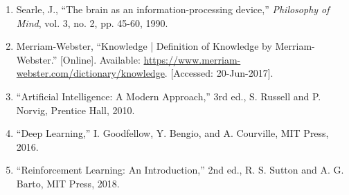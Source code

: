 \documentclass[a4paper, 11pt]{article}
\begin{document}
\begin{enumerate}
    \item Searle, J., “The brain as an information-processing device,” \textit{Philosophy of Mind}, vol. 3, no. 2, pp. 45-60, 1990.
    
    \item Merriam-Webster, “Knowledge | Definition of Knowledge by Merriam-Webster.” [Online]. Available: \url{https://www.merriam-webster.com/dictionary/knowledge}. [Accessed: 20-Jun-2017].
    
    \item “Artificial Intelligence: A Modern Approach,” 3rd ed., S. Russell and P. Norvig, Prentice Hall, 2010.
    
    \item “Deep Learning,” I. Goodfellow, Y. Bengio, and A. Courville, MIT Press, 2016.
    
    \item “Reinforcement Learning: An Introduction,” 2nd ed., R. S. Sutton and A. G. Barto, MIT Press, 2018.
\end{enumerate}
\end{document}
